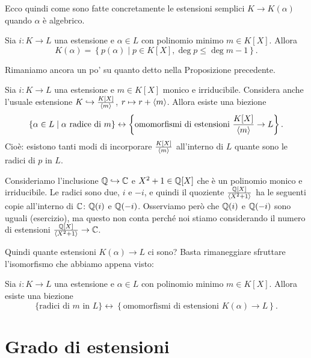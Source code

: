 Ecco quindi come sono fatte concretamente le estensioni semplici $K \to K(\alpha)$ quando $\alpha$ è algebrico.

\begin{coro}\label{coro:KAlgebricoEsplicito}
Sia $i : K \to L$ una estensione e $\alpha \in L$ con polinomio minimo $m \in K[X]$. Allora
\[K(\alpha) = \left\{ p(\alpha) \mid p \in K[X], \deg p \le \deg m -1 \right\} .\]
\end{coro}

Rimaniamo ancora un po' su quanto detto nella Proposizione precedente.

\begin{coro}
Sia $i : K \to L$ una estensione e $m \in K[X]$ monico e irriducibile. Considera anche l'usuale estensione $K \hookrightarrow \frac{K[X]}{\left\langle m\right\rangle}$, $r \mapsto r + \left\langle m\right\rangle$. Allora esiste una biezione
\[\{\alpha \in L \mid \alpha \text{ radice di } m\} \leftrightarrow \left\{\text{omomorfismi di estensioni } \frac{K[X]}{\left\langle m\right\rangle} \to L\right\} .\]
Cioè: esistono tanti modi di incorporare $\frac{K[X]}{\left\langle m\right\rangle}$ all'interno di $L$ quante sono le radici di $p$ in $L$.
\end{coro}

\begin{esem}
Consideriamo l'inclusione $\mathbb{Q} \hookrightarrow \mathbb{C}$ e $X^2+1 \in \mathbb{Q}[X]$ che è un polinomio monico e irriducibile. Le radici sono due, $i$ e $-i$, e quindi il quoziente $\frac{\mathbb{Q}[X]}{\left\langle X^2+1\right\rangle}$ ha le seguenti copie all'interno di $\mathbb{C}$: $\mathbb{Q}(i)$ e \(\mathbb{Q}(-i)\). Osserviamo però che $\mathbb{Q}(i)$ e $\mathbb{Q}(-i)$ sono uguali (esercizio), ma questo non conta perché noi stiamo considerando il numero di estensioni $\frac{\mathbb{Q}[X]}{\left\langle X^2+1\right\rangle} \to \mathbb{C}$.
\end{esem}

Quindi quante estensioni $K(\alpha) \to L$ ci sono? Basta rimaneggiare sfruttare l'isomorfismo che abbiamo appena visto:

\begin{coro}\label{coro:NumeroMorfismiEstensioniDaKAlgebrico}
 Sia $i : K \to L$ una estensione e $\alpha \in L$ con polinomio minimo $m \in K[X]$.  Allora esiste una biezione
\[\{\text{radici di } m \text{ in } L\} \leftrightarrow \left\{\text{omomorfismi di estensioni } K(\alpha) \to L\right\} .\]
\end{coro}


\section{Grado di estensioni}

